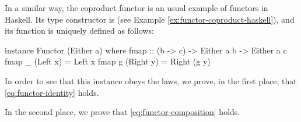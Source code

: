 \begin{example}
  \label{ex:functor-coproduct-haskell}


  In a similar way, the coproduct functor is an usual example of
  functors in Haskell. Its type constructor is 
  (see Example \ref{ex:functor-coproduct-haskell}), and its
   function is uniquely defined as follows:
  \begin{codehaskell}
instance Functor (Either a) where
  fmap :: (b -> c) -> Either a b -> Either a c
  fmap _ (Left x)  = Left x
  fmap g (Right y) = Right (g y)
  \end{codehaskell}
  In order to see that this instance obeys the laws, we prove, in the
  first place, that \eqref{eq:functor-identity} holds.

  \vspace{1em}
  \begin{steps}
  \end{steps}
  \begin{steps}
  \end{steps}
  In the second place, we prove that \eqref{eq:functor-composition}
  holds.

  \vspace{1em}
  \begin{steps}
  \end{steps}
  \begin{steps}
  \end{steps}

\end{example}

